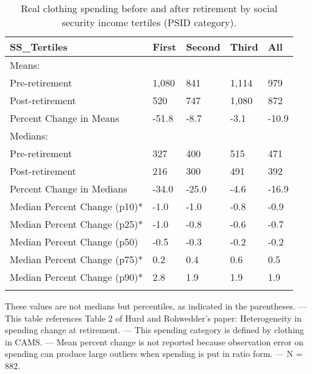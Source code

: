 \begin{table}[tbp] \centering
{}

\caption{Real clothing spending before and after retirement by social security income tertiles (PSID category).}
\begin{tabularx}{\textwidth}{lCCCC}

\toprule
{SS\_Tertiles}&{First}&{Second}&{Third}&{All} \tabularnewline
\midrule\addlinespace[1.5ex]
Means:&&&& \tabularnewline
\midrule Pre-retirement&1,080&841&1,114&979 \tabularnewline
Post-retirement&520&747&1,080&872 \tabularnewline
Percent Change in Means&-51.8&-8.7&-3.1&-10.9 \tabularnewline
\midrule Medians:&&&& \tabularnewline
\midrule Pre-retirement&327&400&515&471 \tabularnewline
Post-retirement&216&300&491&392 \tabularnewline
Percent Change in Medians&-34.0&-25.0&-4.6&-16.9 \tabularnewline
Median Percent Change (p10)*&-1.0&-1.0&-0.8&-0.9 \tabularnewline
Median Percent Change (p25)*&-1.0&-0.8&-0.6&-0.7 \tabularnewline
Median Percent Change (p50)&-0.5&-0.3&-0.2&-0.2 \tabularnewline
Median Percent Change (p75)*&0.2&0.4&0.6&0.5 \tabularnewline
Median Percent Change (p90)*&2.8&1.9&1.9&1.9 \tabularnewline
\bottomrule \addlinespace[1.5ex]

\end{tabularx}
\begin{flushleft}
\footnotesize *These values are not medians but percentiles, as indicated in the parentheses. \linebreak --- \linebreak This table references Table 2 of Hurd and Rohwedder's paper: Heterogeneity in spending change at retirement. \linebreak --- \linebreak This spending category is defined by clothing in CAMS. \linebreak --- \linebreak Mean percent change is not reported because observation error on spending can produce large outliers when spending is put in ratio form. \linebreak --- \linebreak N = 882.
\end{flushleft}
\end{table}
